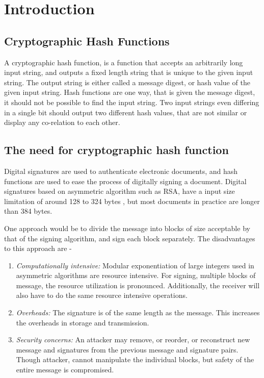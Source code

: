 \chapter{Introduction}

\section{Cryptographic Hash Functions}

A cryptographic hash function, is a function that accepts an arbitrarily long input string, and outputs
a fixed length string that is unique to the given input string. The output string is either called a message
digest, or hash value of the given input string. Hash functions are one way, that is given the message
digest, it should not be possible to find the input string. Two input strings even differing in a single
bit should output two different hash values, that are not similar or display any co-relation to each other.

\section{The need for cryptographic hash function} 

Digital signatures are used to authenticate electronic documents, and hash functions are used to ease the
process of digitally signing a document. Digital signatures based on asymmetric algorithm such as RSA, have a 
input size limitation of around 128 to 324 bytes \cite{00017}, but most documents in practice are longer 
than 384 bytes.

One approach would be to divide the message into blocks of size acceptable by that of the signing 
algorithm, and sign each block separately. The disadvantages to this approach are -

\begin{enumerate}
  \item \emph{Computationally intensive:} Modular exponentiation of large integers used in asymmetric
  algorithms are resource intensive. For signing, multiple blocks of message, the resource utilization
  is pronounced. Additionally, the receiver will also have to do the same resource intensive operations.
  \item \emph{Overheads:} The signature is of the same length as the message. This increases the overheads
  in storage and transmission.
  \item \emph{Security concerns:} An attacker may remove, or reorder, or reconstruct new message and 
  signatures from the previous message and signature pairs. Though attacker, cannot manipulate the individual
  blocks, but safety of the entire message is compromised.
\end{enumerate}

